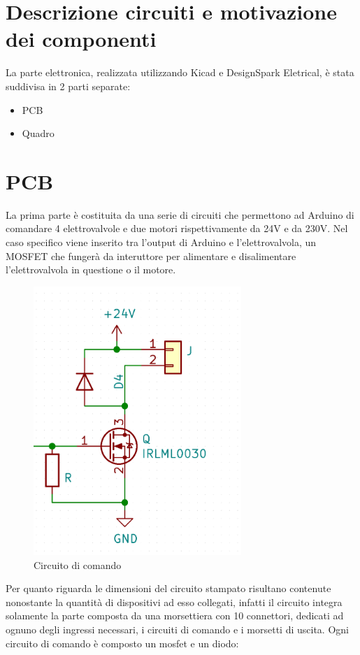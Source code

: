 \documentclass{report}
\begin{document}
\section{Descrizione circuiti e motivazione dei componenti}
La parte elettronica, realizzata utilizzando Kicad e DesignSpark Eletrical, è stata suddivisa in 2 parti separate:
\begin{itemize}
\item PCB
\item Quadro
\end{itemize}
\section{PCB}
La prima parte è costituita da una serie di circuiti che permettono ad Arduino di comandare 4 elettrovalvole e due motori rispettivamente da 24V e da 230V. Nel caso specifico viene inserito tra l'output di Arduino e l'elettrovalvola, un MOSFET che fungerà da interuttore per alimentare e disalimentare l'elettrovalvola in questione o il motore.
\begin{figure}[H]
  \centering
  \includegraphics[width=0.7\textwidth]{src/img/circuito_comando.png}
  \caption{Circuito di comando}
  \label{fig:circuito}
  \end{figure}
Per quanto riguarda le dimensioni del circuito stampato risultano contenute nonostante la quantità di dispositivi ad esso collegati, infatti il circuito integra solamente la parte composta da una morsettiera con 10 connettori, dedicati ad ognuno degli ingressi necessari, i circuiti di comando e i morsetti di uscita. Ogni circuito di comando è composto un mosfet e un diodo: 
\end{document}
